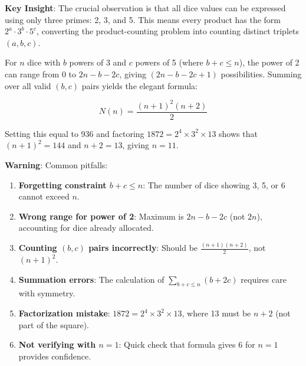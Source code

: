 \documentclass[12pt]{article}
\begin{document}
\begin{keyinsightbox}
\textbf{Key Insight}: The crucial observation is that all dice values can be expressed using only three primes: 2, 3, and 5. This means every product has the form $2^a \cdot 3^b \cdot 5^c$, converting the product-counting problem into counting distinct triplets $(a,b,c)$. 

For $n$ dice with $b$ powers of 3 and $c$ powers of 5 (where $b+c \leq n$), the power of 2 can range from 0 to $2n-b-2c$, giving $(2n-b-2c+1)$ possibilities. Summing over all valid $(b,c)$ pairs yields the elegant formula:

$$N(n) = \frac{(n+1)^2(n+2)}{2}$$

Setting this equal to 936 and factoring $1872 = 2^4 \times 3^2 \times 13$ shows that $(n+1)^2 = 144$ and $n+2 = 13$, giving $n = 11$.
\end{keyinsightbox}

\begin{warningbox}
\textbf{Warning}: Common pitfalls:
\begin{enumerate}
    \item \textbf{Forgetting constraint $b+c \leq n$}: The number of dice showing 3, 5, or 6 cannot exceed $n$.
    \item \textbf{Wrong range for power of 2}: Maximum is $2n-b-2c$ (not $2n$), accounting for dice already allocated.
    \item \textbf{Counting $(b,c)$ pairs incorrectly}: Should be $\frac{(n+1)(n+2)}{2}$, not $(n+1)^2$.
    \item \textbf{Summation errors}: The calculation of $\sum_{b+c \leq n} (b+2c)$ requires care with symmetry.
    \item \textbf{Factorization mistake}: $1872 = 2^4 \times 3^2 \times 13$, where 13 must be $n+2$ (not part of the square).
    \item \textbf{Not verifying with $n=1$}: Quick check that formula gives 6 for $n=1$ provides confidence.
\end{enumerate}
\end{warningbox}
\end{document}
